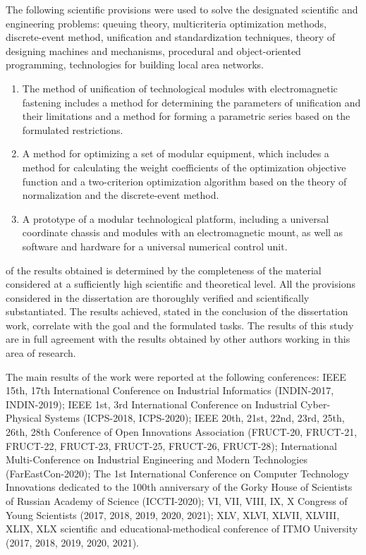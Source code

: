 {\methodsEn} The following scientific provisions were used to solve the designated scientific and engineering problems: queuing theory, multicriteria optimization methods, discrete-event method, unification and standardization techniques, theory of designing machines and mechanisms, procedural and object-oriented programming, technologies for building local area networks.

{}
\begin{enumerate}[beginpenalty=10000] %
	\item The method of unification of technological modules with electromagnetic fastening includes a method for determining the parameters of unification and their limitations and a method for forming a parametric series based on the formulated restrictions.
	\item A method for optimizing a set of modular equipment, which includes a method for calculating the weight coefficients of the optimization objective function and a two-criterion optimization algorithm based on the theory of normalization and the discrete-event method.
	\item A prototype of a modular technological platform, including a universal coordinate chassis and modules with an electromagnetic mount, as well as software and hardware for a universal numerical control unit.
\end{enumerate}

{\reliabilityEn} of the results obtained is determined by the completeness of the material considered at a sufficiently high scientific and theoretical level. All the provisions considered in the dissertation are thoroughly verified and scientifically substantiated. The results achieved, stated in the conclusion of the dissertation work, correlate with the goal and the formulated tasks. The results of this study are in full agreement with the results obtained by other authors working in this area of research.


{\probationEn}
The main results of the work were reported at the following conferences: IEEE 15th, 17th International Conference on Industrial Informatics (INDIN-2017, INDIN-2019); IEEE 1st, 3rd International Conference on Industrial Cyber-Physical Systems (ICPS-2018, ICPS-2020); IEEE 20th, 21st, 22nd, 23rd, 25th, 26th, 28th Conference of Open Innovations Association (FRUCT-20, FRUCT-21, FRUCT-22, FRUCT-23, FRUCT-25, FRUCT-26, FRUCT-28); International Multi-Conference on Industrial Engineering and Modern Technologies (FarEastCon-2020); The 1st International Conference on Computer Technology Innovations dedicated to the 100th anniversary of the Gorky House of Scientists of Russian Academy of Science (ICCTI-2020); VI, VII, VIII, IX, X  Congress of Young Scientists (2017, 2018, 2019, 2020, 2021); XLV, XLVI, XLVII, XLVIII, XLIX, XLX  scientific and educational-methodical conference of {ITMO} University (2017, 2018, 2019, 2020, 2021).


